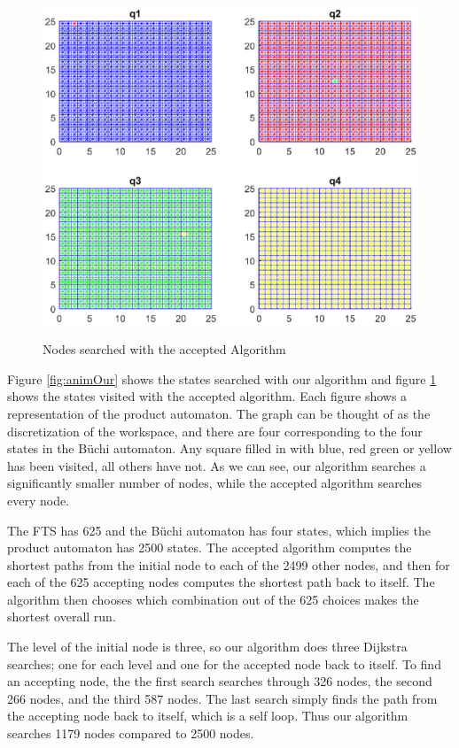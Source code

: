 \begin{figure}[!htb]
\centering
\includegraphics[scale=0.9]{acceptedPlot}
\label{fig:animAccept}
\caption{Nodes searched with the accepted Algorithm}
\end{figure}

Figure \ref{fig:animOur} shows the states searched with our algorithm and figure \ref{fig:animAccept} shows the states visited with the accepted algorithm. Each figure shows a representation of the product automaton. The graph can be thought of as the discretization of the workspace, and there are four corresponding to the four states in the B\"uchi automaton. Any square filled in with blue, red green or yellow has been visited, all others have not. As we can see, our algorithm searches a significantly smaller number of nodes, while the accepted algorithm searches every node.

The FTS has 625 and the B\"uchi automaton has four states, which implies the product automaton has 2500 states. The accepted algorithm computes the shortest paths from the initial node to each of the 2499 other nodes, and then for each of the 625 accepting nodes computes the shortest path back to itself. The algorithm then chooses which combination out of the 625 choices makes the shortest overall run. 

The level of the initial node is three, so our algorithm does three Dijkstra searches; one for each level and one for the accepted node back to itself. To find an accepting node, the the first search searches through 326 nodes, the second 266 nodes, and the third 587 nodes. The last search simply finds the path from the accepting node back to itself, which is a self loop. Thus our algorithm searches 1179 nodes compared to 2500 nodes.  



